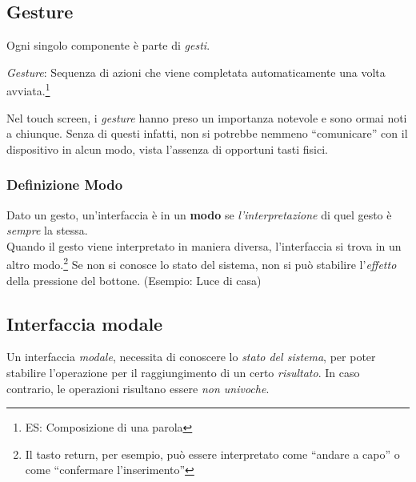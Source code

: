 \documentclass[oneside]{book}
\begin{document}
		\subsection{Gesture}
			Ogni singolo componente è parte di \emph{gesti}. 
			\begin{em}
			\begin{center}
			\emph{Gesture}: Sequenza di azioni che viene completata automaticamente una volta avviata.\footnote{ ES: Composizione di una parola}
			\end{center}
			\end{em}
			Nel touch screen, i \emph{gesture} hanno preso un importanza notevole e sono ormai noti a chiunque. Senza di questi infatti, non si potrebbe nemmeno ``comunicare'' con il dispositivo in alcun modo, vista l'assenza di opportuni tasti fisici.

			\subsubsection{Definizione Modo}
				Dato un gesto, un'interfaccia è in un \textbf{modo} se \emph{l'interpretazione} di quel gesto è \emph{sempre} la stessa. \\
				Quando il gesto viene interpretato in maniera diversa, l'interfaccia si trova in un altro modo.\footnote{ Il tasto return, per esempio, può essere interpretato come ``andare a capo'' o come ``confermare l'inserimento''}
				Se non si conosce lo stato del sistema, non si può stabilire l'\emph{effetto} della pressione del bottone. (Esempio: Luce di casa)

		\subsection{Interfaccia modale}
			Un interfaccia \emph{modale}, necessita di conoscere lo \emph{stato del sistema}, per poter stabilire l'operazione per il raggiungimento di un certo \emph{risultato}. In caso contrario, le operazioni risultano essere \emph{non univoche}.
			
\end{document}
